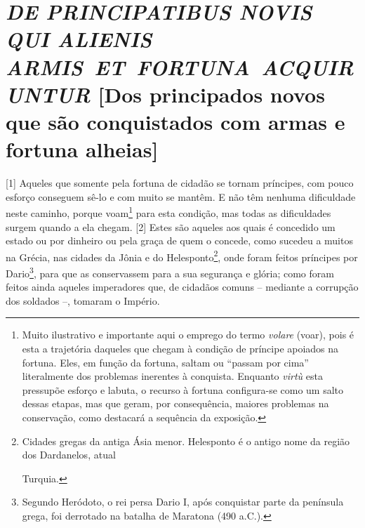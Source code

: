 \quebra\section{\emph{DE PRINCIPATIBUS NOVIS QUI ALIENIS ARMIS~ET~FORTUNA~ACQUIRUNTUR}\break
{[}Dos principados novos que são conquistados com armas e fortuna alheias{]}}

{[}1{]} Aqueles que somente pela fortuna de cidadão se tornam príncipes,
com pouco esforço conseguem sê-lo e com muito se mantêm. E não têm
nenhuma dificuldade neste caminho, porque voam\footnote{Muito
  ilustrativo e importante aqui o emprego do termo \emph{volare} (voar),
  pois é esta a trajetória daqueles que chegam à condição de príncipe
  apoiados na fortuna. Eles, em função da fortuna, saltam ou ``passam
  por cima'' literalmente dos problemas inerentes à conquista. Enquanto
  \emph{virtù} esta pressupõe esforço e labuta, o recurso à fortuna
  configura-se como um salto dessas etapas, mas que geram, por
  consequência, maiores problemas na conservação, como destacará a
  sequência da exposição.} para esta condição, mas todas as dificuldades
surgem quando a ela chegam. {[}2{]} Estes são aqueles aos quais é
concedido um estado ou por dinheiro ou pela graça de quem o concede,
como sucedeu a muitos na Grécia, nas cidades da Jônia e do
Helesponto\footnote{Cidades gregas da antiga Ásia menor. Helesponto é o
  antigo nome da região dos Dardanelos, atual

  Turquia.}, onde foram feitos príncipes por Dario\footnote{Segundo
  Heródoto, o rei persa Dario I, após conquistar parte da península
  grega, foi derrotado na batalha de Maratona (490 a.C.).}, para que as
conservassem para a sua segurança e glória; como foram feitos ainda
aqueles imperadores que, de cidadãos comuns -- mediante a corrupção dos
soldados --, tomaram o Império.

